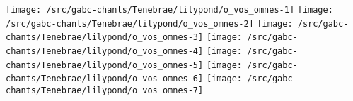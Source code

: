 \texttt{[image: /src/gabc-chants/Tenebrae/lilypond/o\_vos\_omnes-1]}%
\ifx\betweenLilyPondSystem \undefined
  \linebreak
\else
  \expandafter{}%
\fi
\texttt{[image: /src/gabc-chants/Tenebrae/lilypond/o\_vos\_omnes-2]}%
\ifx\betweenLilyPondSystem \undefined
  \linebreak
\else
  \expandafter{}%
\fi
\texttt{[image: /src/gabc-chants/Tenebrae/lilypond/o\_vos\_omnes-3]}%
\ifx\betweenLilyPondSystem \undefined
  \linebreak
\else
  \expandafter{}%
\fi
\texttt{[image: /src/gabc-chants/Tenebrae/lilypond/o\_vos\_omnes-4]}%
\ifx\betweenLilyPondSystem \undefined
  \linebreak
\else
  \expandafter{}%
\fi
\texttt{[image: /src/gabc-chants/Tenebrae/lilypond/o\_vos\_omnes-5]}%
\ifx\betweenLilyPondSystem \undefined
  \linebreak
\else
  \expandafter{}%
\fi
\texttt{[image: /src/gabc-chants/Tenebrae/lilypond/o\_vos\_omnes-6]}%
\ifx\betweenLilyPondSystem \undefined
  \linebreak
\else
  \expandafter{}%
\fi
\texttt{[image: /src/gabc-chants/Tenebrae/lilypond/o\_vos\_omnes-7]}%

